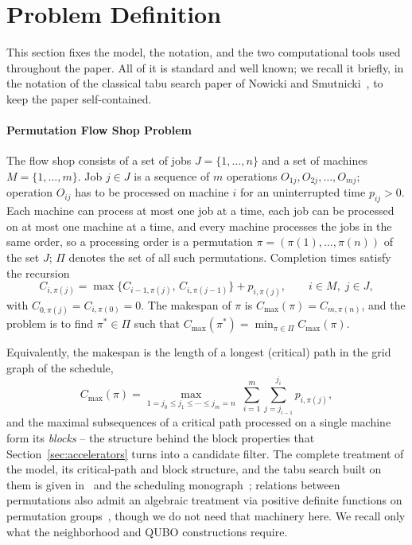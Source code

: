 \documentclass[preprint,12pt,authoryear]{elsarticle}
\begin{document}
\section{Problem Definition}
\label{sec:problem}

This section fixes the model, the notation, and the two computational
tools used throughout the paper. All of it is standard and well known;
we recall it briefly, in the notation of the classical tabu search
paper of Nowicki and Smutnicki~\citep{nowicki96}, to keep the paper
self-contained.

\paragraph{Permutation Flow Shop Problem}
The flow shop consists of a set of
jobs $J = \{1,\ldots,n\}$ and a set of machines
$M = \{1,\ldots,m\}$. Job $j \in J$ is a sequence of $m$ operations
$O_{1j}, O_{2j}, \ldots, O_{mj}$; operation $O_{ij}$ has to be
processed on machine $i$ for an uninterrupted time $p_{ij} > 0$. Each
machine can process at most one job at a time, each job can be
processed on at most one machine at a time, and every machine
processes the jobs in the same order, so a processing order is a
permutation $\pi = (\pi(1), \ldots, \pi(n))$ of the set $J$; $\Pi$
denotes the set of all such permutations. Completion times satisfy
the recursion
\begin{equation}
  C_{i,\pi(j)} = \max\!\bigl\{C_{i-1,\pi(j)},\, C_{i,\pi(j-1)}\bigr\}
  + p_{i,\pi(j)}, \qquad i \in M,\; j \in J,
\end{equation}
with $C_{0,\pi(j)} = C_{i,\pi(0)} = 0$. The makespan of $\pi$ is
$C_{\max}(\pi) = C_{m,\pi(n)}$, and the problem is to find
$\pi^* \in \Pi$ such that
$C_{\max}(\pi^*) = \min_{\pi \in \Pi} C_{\max}(\pi)$.

Equivalently, the makespan is the length of a longest (critical) path
in the grid graph of the schedule,
\begin{equation}
  C_{\max}(\pi) = \max_{1 = j_0 \leq j_1 \leq \cdots \leq j_m = n}\;
  \sum_{i=1}^{m} \sum_{j=j_{i-1}}^{j_i} p_{i,\pi(j)},
  \label{eq:critpath}
\end{equation}
and the maximal subsequences of a critical path processed on a single
machine form its \emph{blocks} -- the structure behind the block
properties that Section~\ref{sec:accelerators} turns into a candidate
filter. The complete treatment of the model, its critical-path and
block structure, and the tabu search built on them is given
in~\citep{nowicki96} and the scheduling
monograph~\citep{smutnicki2012}; relations between permutations also
admit an algebraic treatment via positive definite functions on
permutation groups~\citep{bozejko2015}, though we do not need that
machinery here. We recall only what the neighborhood and QUBO
constructions require.
\end{document}
